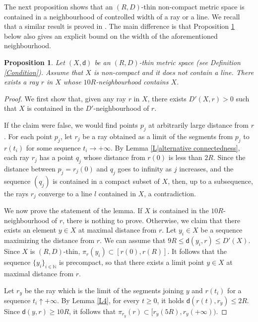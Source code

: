 \documentclass[10pt]{article}
\newtheorem{proposition}[thm]{Proposition}
\theoremstyle{definition}
\newcommand{\bb}[1]{\mathbb{#1}}
\newcommand{\sd}{\mathsf{d}}
\begin{document}
The next proposition shows that an $(R,D)$-thin non-compact metric space is contained in a neighbourhood of controlled width of a ray or a line. We recall that a similar result is proved in \cite[Section 5]{TrianglesKapo}. The main difference is that Proposition \ref{P10} below also gives an explicit bound on the width of the aforementioned neighbourhood.

\begin{proposition} \label{P10} 
    Let $(X,\sd)$ be an $(R,D)$-thin metric space (see Definition \ref{Condition}).
     Assume that $X$ is non-compact and it does not contain a line.
     There exists a ray $r$ in $X$ whose $10R$-neighbourhood contains $X$.
        \end{proposition}
        \begin{proof}
            We first show that, given any ray $r$ in $X$, there exists $D'(X,r)>0$ such that $X$ is contained in the $D'$-neighbourhood of $r$.
            
            If the claim were false, we would find points $p_j$ at arbitrarily large distance from $r$. 
            For each point $p_j$, let $r_j$ be a ray  obtained as a limit of the segments from $p_j$ to $r(t_i)$ for some sequence $t_i \to + \infty$. 
           By Lemma \ref{L|alternative connectedness}, each ray $r_j$ has a point $q_j$ whose distance from $r(0)$ is less than $2R$. 
            Since the distance between $p_j=r_j(0)$ and $q_j$ goes to infinity as $j$ increases, and the sequence $(q_j)$ is contained in a compact subset of $X$, then, up to a subsequence,  the rays $r_j$ converge to a line  $l$ contained in $X$, a contradiction.

           We now prove the statement of the lemma.
           If $X$ is contained in the $10R$-neighbourhood of $r$, there is nothing to prove. 
           Otherwise, we claim that there exists an element $y \in X$ at maximal distance from $r$. 
            Let $y_i \in X$ be a sequence maximizing the distance from $r$. We can assume that $9R \leq \sd(y_i,r) \leq D'(X)$. Since $X$ is $(R,D)$-thin, $\pi_r(y_i) \subset [r(0),r(R)]$. It follows that the sequence $\{y_i\}_{i \in \bb{N}}$ is precompact, so that there exists a limit point $y \in X$ at maximal distance from $r$.

           
           Let $r_y$ be the ray which is the limit of the segments joining $y$ and $r(t_i)$ for a sequence $t_i \uparrow + \infty$. By Lemma \ref{L4}, for every $t \geq 0$, it holds $\sd(r(t),r_y) \leq 2R$. Since $\sd(y,r) \geq 10R$, it follows that $\pi_{r_y}(r) \subset [r_y(5R),r_y(+\infty))$. 


\end{proof}
\end{document}
